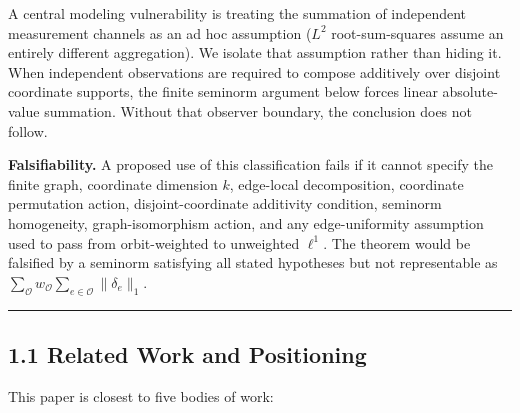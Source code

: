 \documentclass[
  11pt,
]{article}
\begin{document}
A central modeling vulnerability is treating the summation of
independent measurement channels as an ad hoc assumption (\(L^2\)
root-sum-squares assume an entirely different aggregation). We isolate
that assumption rather than hiding it. When independent observations are
required to compose additively over disjoint coordinate supports, the
finite seminorm argument below forces linear absolute-value summation.
Without that observer boundary, the conclusion does not follow.

\textbf{Falsifiability.} A proposed use of this classification fails if
it cannot specify the finite graph, coordinate dimension \(k\),
edge-local decomposition, coordinate permutation action,
disjoint-coordinate additivity condition, seminorm homogeneity,
graph-isomorphism action, and any edge-uniformity assumption used to
pass from orbit-weighted to unweighted \(\ell^1\). The theorem would be
falsified by a seminorm satisfying all stated hypotheses but not
representable as
\(\sum_{\mathcal O}w_{\mathcal O}\sum_{e\in\mathcal O}\|\delta_e\|_1\).

\begin{center}\rule{0.5\linewidth}{0.5pt}\end{center}

\hypertarget{related-work-and-positioning}{%
\subsection{1.1 Related Work and
Positioning}\label{related-work-and-positioning}}

This paper is closest to five bodies of work:
\end{document}

